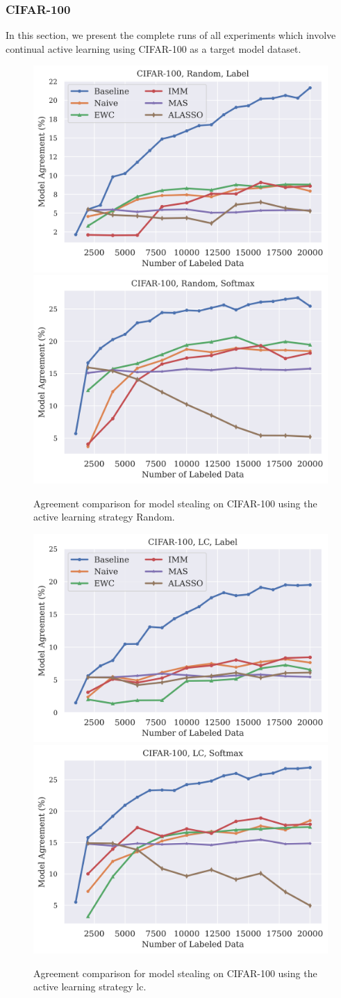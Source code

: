 \clearpage

\subsubsection{CIFAR-100}
\label{sec:Appendix:CALMS:CIFAR100}
In this section, we present the complete runs of all experiments which involve continual active learning using CIFAR-100 as a target model dataset.

\begin{figure}[!htb]
    \centering
    \includegraphics[width=0.48\linewidth]{images/results_CALMS/cifar100_label_random.png} \hfill
    \includegraphics[width=0.48\linewidth]{images/results_CALMS/cifar100_softmax_random.png}
    \caption{Agreement comparison for model stealing on CIFAR-100 using the active learning strategy Random.}
    \label{fig:CALMSCIFAR100Random}
\end{figure}

\begin{figure}[!htb]
    \centering
    \includegraphics[width=0.48\linewidth]{images/results_CALMS/cifar100_label_lc.png} \hfill
    \includegraphics[width=0.48\linewidth]{images/results_CALMS/cifar100_softmax_lc.png}
    \caption{Agreement comparison for model stealing on CIFAR-100 using the active learning strategy \gls{lc}.}
    \label{fig:CALMSCIFAR100LC}
\end{figure}


